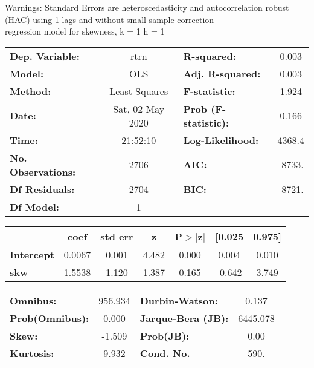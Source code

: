 Warnings: \newline
 [1] Standard Errors are heteroscedasticity and autocorrelation robust (HAC) using 1 lags and without small sample correction\\ 

regression model for skewness, k = 1 h = 1\begin{center}
\begin{tabular}{lclc}
\toprule
\textbf{Dep. Variable:}    &       rtrn       & \textbf{  R-squared:         } &     0.003   \\
\textbf{Model:}            &       OLS        & \textbf{  Adj. R-squared:    } &     0.003   \\
\textbf{Method:}           &  Least Squares   & \textbf{  F-statistic:       } &     1.924   \\
\textbf{Date:}             & Sat, 02 May 2020 & \textbf{  Prob (F-statistic):} &    0.166    \\
\textbf{Time:}             &     21:52:10     & \textbf{  Log-Likelihood:    } &    4368.4   \\
\textbf{No. Observations:} &        2706      & \textbf{  AIC:               } &    -8733.   \\
\textbf{Df Residuals:}     &        2704      & \textbf{  BIC:               } &    -8721.   \\
\textbf{Df Model:}         &           1      & \textbf{                     } &             \\
\bottomrule
\end{tabular}
\begin{tabular}{lcccccc}
                   & \textbf{coef} & \textbf{std err} & \textbf{z} & \textbf{P$> |$z$|$} & \textbf{[0.025} & \textbf{0.975]}  \\
\midrule
\textbf{Intercept} &       0.0067  &        0.001     &     4.482  &         0.000        &        0.004    &        0.010     \\
\textbf{skw}       &       1.5538  &        1.120     &     1.387  &         0.165        &       -0.642    &        3.749     \\
\bottomrule
\end{tabular}
\begin{tabular}{lclc}
\textbf{Omnibus:}       & 956.934 & \textbf{  Durbin-Watson:     } &    0.137  \\
\textbf{Prob(Omnibus):} &   0.000 & \textbf{  Jarque-Bera (JB):  } & 6445.078  \\
\textbf{Skew:}          &  -1.509 & \textbf{  Prob(JB):          } &     0.00  \\
\textbf{Kurtosis:}      &   9.932 & \textbf{  Cond. No.          } &     590.  \\
\bottomrule
\end{tabular}
\end{center}

